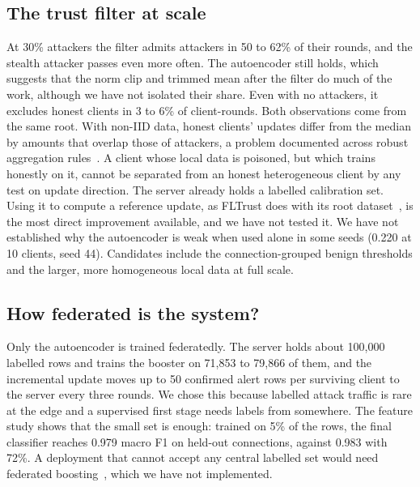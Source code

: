 \subsection{The trust filter at scale}
At 30\% attackers the filter admits attackers in 50 to 62\% of their rounds, and the stealth attacker passes even more often. The autoencoder still holds, which suggests that the norm clip and trimmed mean after the filter do much of the work, although we have not isolated their share. Even with no attackers, it excludes honest clients in 3 to 6\% of client-rounds. Both observations come from the same root. With non-IID data, honest clients' updates differ from the median by amounts that overlap those of attackers, a problem documented across robust aggregation rules~\cite{li2024experimental}. A client whose local data is poisoned, but which trains honestly on it, cannot be separated from an honest heterogeneous client by any test on update direction. The server already holds a labelled calibration set. Using it to compute a reference update, as FLTrust does with its root dataset~\cite{cao2021fltrust}, is the most direct improvement available, and we have not tested it. We have not established why the autoencoder is weak when used alone in some seeds (0.220 at 10 clients, seed 44). Candidates include the connection-grouped benign thresholds and the larger, more homogeneous local data at full scale.

\subsection{How federated is the system?}
Only the autoencoder is trained federatedly. The server holds about 100,000 labelled rows and trains the booster on 71,853 to 79,866 of them, and the incremental update moves up to 50 confirmed alert rows per surviving client to the server every three rounds. We chose this because labelled attack traffic is rare at the edge and a supervised first stage needs labels from somewhere. The feature study shows that the small set is enough: trained on 5\% of the rows, the final classifier reaches 0.979 macro F1 on held-out connections, against 0.983 with 72\%. A deployment that cannot accept any central labelled set would need federated boosting~\cite{cheng2021secureboost}, which we have not implemented.


